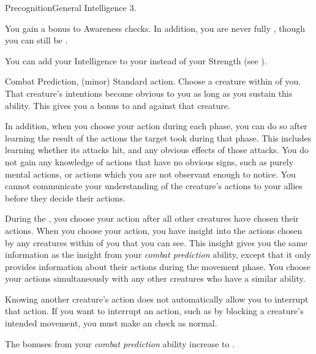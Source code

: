   \begin{feat}{Precognition}{General}
    \featpre Intelligence 3.

     You gain a  bonus to Awareness checks.
    In addition, you are never fully \unaware, though you can still be \partiallyunaware.

     You can add your Intelligence to your  instead of your Strength (see ).

    \begin{sustainability}{Combat Prediction}{,  (minor)}
      \abilityusagetime Standard action.
      \rankline
      Choose a creature within \medrange of you.
      That creature's intentions become obvious to you as long as you sustain this ability.
      This gives you a  bonus to  and  against that creature.

      In addition, when you choose your action during each phase, you can do so after learning the result of the actions the target took during that phase.
      This includes learning whether its attacks hit, and any obvious effects of those attacks.
      You do not gain any knowledge of actions that have no obvious signs, such as purely mental actions, or actions which you are not observant enough to notice.
      You cannot communicate your understanding of the creature's actions to your allies before they decide their actions.
    \end{sustainability}

     During the , you choose your action after all other creatures have chosen their actions.
    When you choose your action, you have insight into the actions chosen by any creatures within \longrange of you that you can see.
    This insight gives you the same information as the insight from your \textit{combat prediction} ability, except that it only provides information about their actions during the movement phase.
    You choose your actions simultaneously with any other creatures who have a similar ability.

    Knowing another creature's action does not automatically allow you to interrupt that action.
    If you want to interrupt an action, such as by blocking a creature's intended movement, you must make an  check as normal.

     The bonuses from your \textit{combat prediction} ability increase to .
  \end{feat}

